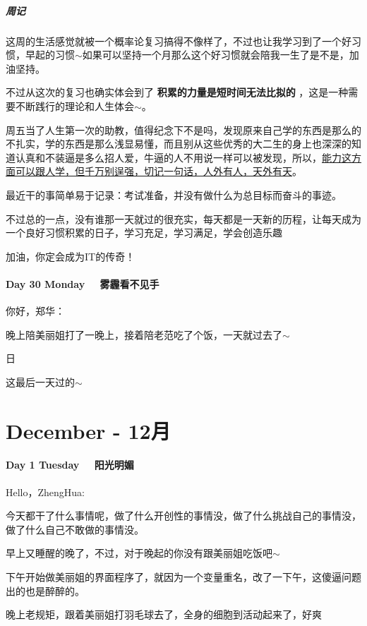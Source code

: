 \documentclass[UTF8,a4paper,8pt]{ctexart}
\begin{document}
          \subparagraph{周记}   
          这周的生活感觉就被一个概率论复习搞得不像样了，不过也让我学习到了一个好习惯，早起的习惯$\sim$如果可以坚持一个月那么这个好习惯就会陪我一生了是不是，加油坚持。
          
          不过从这次的复习也确实体会到了 \textbf{积累的力量是短时间无法比拟的 }，这是一种需要不断践行的理论和人生体会$\sim$。
          
          周五当了人生第一次的助教，值得纪念下不是吗，发现原来自己学的东西是那么的不扎实，学的东西是那么浅显易懂，而且别从这些优秀的大二生的身上也深深的知道认真和不装逼是多么招人爱，牛逼的人不用说一样可以被发现，所以，\underline{能力这方面可以跟人学，但千万别逞强，切记一句话，人外有人，天外有天}。
          
          最近干的事简单易于记录：考试准备，并没有做什么为总目标而奋斗的事迹。
          
          不过总的一点，没有谁那一天就过的很充实，每天都是一天新的历程，让每天成为一个良好习惯积累的日子，学习充足，学习满足，学会创造乐趣
          
          加油，你定会成为IT的传奇！
          
      \paragraph{Day 30  Monday  \  \ 雾霾看不见手}
         你好，郑华：
         
         晚上陪美丽姐打了一晚上，接着陪老范吃了个饭，一天就过去了$\sim$
         
         日
         
         这最后一天过的$\sim$
 \section{December - 12月}	  
      \paragraph{Day 1  Tuesday  \  \ 阳光明媚}
      Hello，ZhengHua:
      
      今天都干了什么事情呢，做了什么开创性的事情没，做了什么挑战自己的事情没，做了什么自己不敢做的事情没。
      
      早上又睡醒的晚了，不过，对于晚起的你没有跟美丽姐吃饭吧$\sim$
      
      下午开始做美丽姐的界面程序了，就因为一个变量重名，改了一下午，这傻逼问题出的也是醉醉的。
      
      晚上老规矩，跟着美丽姐打羽毛球去了，全身的细胞到活动起来了，好爽
      
\end{document}
